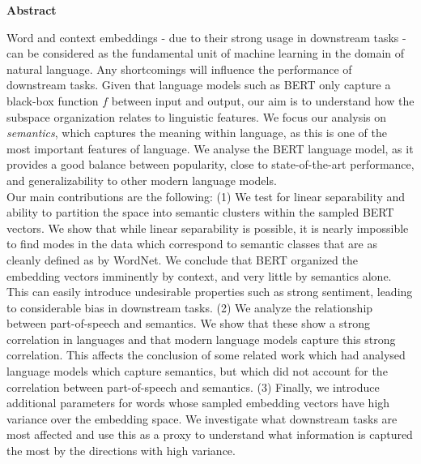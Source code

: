 \newpage
{\Huge \bf Abstract}
\vspace{24pt} 


Word and context embeddings - due to their strong usage in downstream tasks - can be considered as the fundamental unit of machine learning in the domain of natural language.
Any shortcomings will influence the performance of downstream tasks.
Given that language models such as BERT only capture a black-box function $f$ between input and output, our aim is to understand how the subspace organization relates to linguistic features.
We focus our analysis on \textit{semantics}, which captures the meaning within language, as this is one of the most important features of language. 
We analyse the BERT language model, as it provides a good balance between popularity, close to state-of-the-art performance, and generalizability to other modern language models.
\\

Our main contributions are the following: (1) We test for linear separability and ability to partition the space into semantic clusters within the sampled BERT vectors.
We show that while linear separability is possible, it is nearly impossible to find modes in the data which correspond to semantic classes that are as cleanly defined as by WordNet.
We conclude that BERT organized the embedding vectors imminently by context, and very little by semantics alone.
This can easily introduce undesirable properties such as strong sentiment, leading to considerable bias in downstream tasks.
(2) We analyze the relationship between part-of-speech and semantics. 
We show that these show a strong correlation in languages and that modern language models capture this strong correlation.
This affects the conclusion of some related work which had analysed language models which capture semantics, but which did not account for the correlation between part-of-speech and semantics.
(3) Finally, we introduce additional parameters for words whose sampled embedding vectors have high variance over the embedding space.
We investigate what downstream tasks are most affected  and use this as a proxy to understand what information is captured the most by the directions with high variance. \\

\newpage
\vspace*{\fill}
